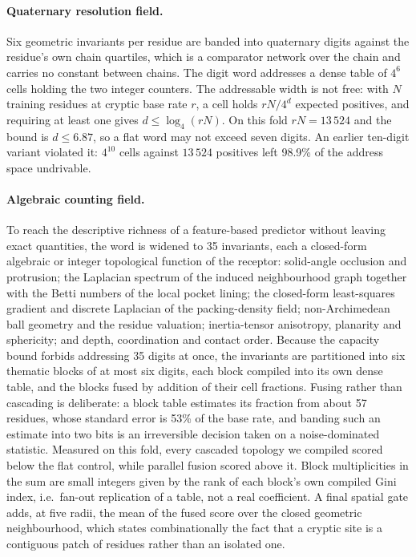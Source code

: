 \documentclass[11pt]{article}
\begin{document}
\paragraph{Quaternary resolution field.} Six geometric invariants per residue are
banded into quaternary digits against the residue's own chain quartiles, which
is a comparator network over the chain and carries no constant between chains.
The digit word addresses a dense table of \(4^{6}\) cells holding the two
integer counters. The addressable width is not free: with \(N\) training residues
at cryptic base rate \(r\), a cell holds \(rN/4^{d}\) expected positives, and
requiring at least one gives \(d \le \log_4(rN)\). On this fold
\(rN = 13\,524\) and the bound is \(d \le 6.87\), so a flat word may not exceed
seven digits. An earlier ten-digit variant violated it: \(4^{10}\) cells against
\(13\,524\) positives left 98.9\% of the address space undrivable.

\paragraph{Algebraic counting field.} To reach the descriptive richness of a
feature-based predictor without leaving exact quantities, the word is widened to
35 invariants, each a closed-form algebraic or integer topological function of
the receptor: solid-angle occlusion and protrusion; the Laplacian spectrum of the
induced neighbourhood graph together with the Betti numbers of the local pocket
lining; the closed-form least-squares gradient and discrete Laplacian of the
packing-density field; non-Archimedean ball geometry and the residue valuation;
inertia-tensor anisotropy, planarity and sphericity; and depth, coordination and
contact order. Because the capacity bound forbids addressing 35 digits at once,
the invariants are partitioned into six thematic blocks of at most six digits,
each block compiled into its own dense table, and the blocks fused by addition of
their cell fractions. Fusing rather than cascading is deliberate: a block table
estimates its fraction from about 57 residues, whose standard error is 53\% of
the base rate, and banding such an estimate into two bits is an irreversible
decision taken on a noise-dominated statistic. Measured on this fold, every
cascaded topology we compiled scored below the flat control, while parallel
fusion scored above it. Block multiplicities in the sum are small integers given
by the rank of each block's own compiled Gini index, i.e.\ fan-out replication of
a table, not a real coefficient. A final spatial gate adds, at five radii, the
mean of the fused score over the closed geometric neighbourhood, which states
combinationally the fact that a cryptic site is a contiguous patch of residues
rather than an isolated one.
\end{document}
